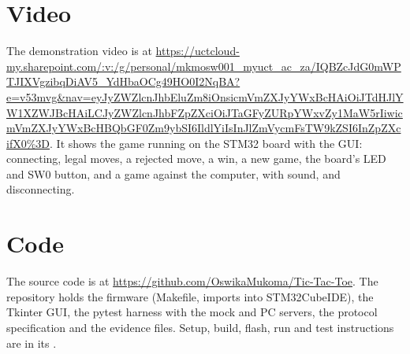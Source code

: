 \section{Video}
\label{sec:video}

The demonstration video is at \url{https://uctcloud-my.sharepoint.com/:v:/g/personal/mkmosw001_myuct_ac_za/IQBZcJdG0mWPTJIXVgzibqDiAV5_YdHbaOCg49HO0I2NqBA?e=v53mvg&nav=eyJyZWZlcnJhbEluZm8iOnsicmVmZXJyYWxBcHAiOiJTdHJlYW1XZWJBcHAiLCJyZWZlcnJhbFZpZXciOiJTaGFyZURpYWxvZy1MaW5rIiwicmVmZXJyYWxBcHBQbGF0Zm9ybSI6IldlYiIsInJlZmVycmFsTW9kZSI6InZpZXcifX0\%3D}. It shows the game running on the STM32 board with the GUI: connecting, legal moves, a rejected move, a win, a new game, the board's LED and SW0 button, and a game against the computer, with sound, and disconnecting.

\section{Code}
\label{sec:code}

The source code is at \url{https://github.com/OswikaMukoma/Tic-Tac-Toe}. The repository holds the firmware (Makefile, imports into STM32CubeIDE), the Tkinter GUI, the pytest harness with the mock and PC servers, the protocol specification and the evidence files. Setup, build, flash, run and test instructions are in its .
